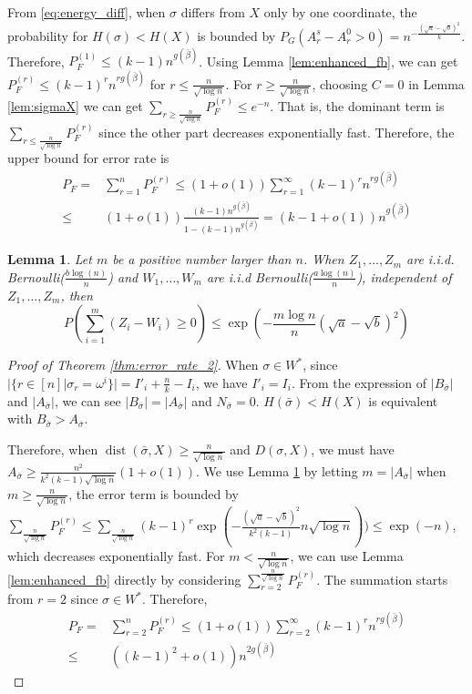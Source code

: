 \documentclass[journal]{IEEEtran}
\newtheorem{lemma}{Lemma}
\newcommand{\A}{\frac{a \log(n)}{n}}
\newcommand{\B}{\frac{b \log(n)}{n}}
\newcommand{\1}{\mathbbm{1}}
\DeclareMathOperator{\dist}{dist}
\begin{document}
From \eqref{eq:energy_diff}, when $\sigma$ differs from $X$ only by one coordinate, the probability for $H(\sigma) < H(X)$ is
bounded by $P_G(A_r^s - A_r^0 > 0) = n^{-\frac{(\sqrt{a}-\sqrt{b})^2}{k}}$. Therefore, $P_F^{(1)}  \leq (k-1)n^{g(\bar{\beta})}$.
Using Lemma \ref{lem:enhanced_fb}, we can get $P_F^{(r)} \leq (k-1)^r n^{rg(\bar{\beta})}$ for $ r \leq \frac{n}{\sqrt{\log n}}$.
For $ r \geq \frac{n}{\sqrt{\log n}}$, choosing $C=0$ in Lemma \ref{lem:sigmaX} we can get $\sum_{r\geq \frac{n}{\sqrt{\log n}}}P_F^{(r)} \leq e^{-n}$.
That is, the dominant term is $\sum_{r\leq \frac{n}{\sqrt{\log n}}}P_F^{(r)}$ since the other part decreases exponentially fast.
Therefore, the upper bound for error rate is
\begin{align*}
P_F = & \sum_{r=1}^n P_F^{(r)} \leq (1+o(1)) \sum_{r=1}^{\infty} (k-1)^r n^{rg(\bar{\beta})}\\
 \leq & (1+o(1))\frac{(k-1) n^{g(\bar{\beta})}}{1-(k-1) n^{g(\bar{\beta})}} = (k-1+o(1))n^{g(\bar{\beta})}
\end{align*}
\begin{lemma}\label{lem:mZW}
	Let $m$ be a positive number larger than $n$.
	When $Z_1, \dots, Z_m$ are i.i.d. Bernoulli($\B$) and $W_1, \dots, W_m$ are i.i.d Bernoulli($\A$), independent of $Z_1, \dots, Z_m$,
	then
	\begin{equation}
	P(\sum_{i=1}^m (Z_i  - W_i) \geq 0) \leq \exp(-\frac{m \log n}{n}(\sqrt{a} - \sqrt{b})^2)
	\end{equation}
\end{lemma}
\begin{proof}[Proof of Theorem \ref{thm:error_rate_2}]
When $\sigma \in W^*$, since $|\{r\in [n] | \sigma_r = \omega^i \}| = I'_i + \frac{n}{k} - I_i $, we have $I'_i = I_i$.
From the expression of $|B_{\bar{\sigma}}|$ and $|A_{\bar{\sigma}}|$, we can see  $|B_{\bar{\sigma}}| = |A_{\bar{\sigma}}|$
and $N_{\bar{\sigma}} = 0$. $H(\bar{\sigma}) < H(X)$ is equivalent with $B_{\bar{\sigma}} > A_{\bar{\sigma}}$.

Therefore, when $ \dist(\bar{\sigma}, X) \geq \frac{n}{\sqrt{\log n} }$ and $D(\sigma, X)$,
we must have $A_{\bar{\sigma}} \geq \frac{n^2}{k^2(k-1)\sqrt{\log n} } (1+o(1))$.
We use Lemma \ref{lem:mZW} by letting $m=|A_{\bar{\sigma}}|$ when $m \geq \frac{n}{ \sqrt{\log n}}$, the error term is bounded
by $\sum_{\frac{n}{ \sqrt{\log n}}} P_F^{(r)} \leq \sum_{\frac{n}{ \sqrt{\log n}}} (k-1)^r \exp(-\frac{(\sqrt{a} - \sqrt{b})^2}{k^2(k-1)} n \sqrt{\log n}))
\leq \exp(-n)$, which decreases exponentially fast.
For $m < \frac{n}{ \sqrt{\log n}}$, we can use Lemma \ref{lem:enhanced_fb} directly 
by considering $\sum_{r=2}^{\frac{n}{ \sqrt{\log n}}} P_F^{(r)}$. The summation starts from $r=2$ since $\sigma \in W^*$.
Therefore,
\begin{align*}
P_F = & \sum_{r=2}^n P_F^{(r)} \leq (1+o(1)) \sum_{r=2}^{\infty} (k-1)^r n^{rg(\bar{\beta})}\\
\leq & ((k-1)^2+o(1))n^{2g(\bar{\beta})}
\end{align*}
\end{proof}


\end{document}
